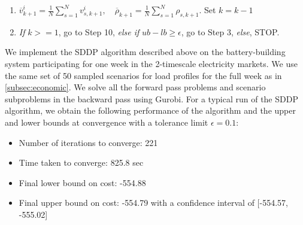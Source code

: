 \documentclass[11pt,twoside]{article}
\begin{document}
{\begin{enumerate}
\begin{enumerate}
\item Add a cut to the optimization problems $\mathcal{P}^f_{k}$ and $\mathcal{P}^b_{k}$: $\theta_{k+1} \geq \overline{v}^i_{k+1} - \overline{\rho}_{k+1}E_{n_\text{rtm}, k}$
\item Solve the problem $\mathcal{P}^b_{k}$. Get the optimal objective value $Q^{i+1}_{s,k+1}(E_{0, k})$ and the duals corresponding to each of the ${n_\text{rtm}}$ constraints linking the state variables at each subinterval. Denote the sum of these duals by $\rho_{s,k+1}$ and calculate $v^i_{s,k+1} = Q^{i+1}_{s,k+1}(E_{0, k}) - \rho_{s,k+1} E_{n_\text{rtm},k-1}$
\end{enumerate}
\emph{end for}
\item $\overline{v}^i_{k+1} = \frac{1}{N}\sum\limits_{s=1}^{N}{v^i_{s,k+1}}, \quad \overline{\rho}_{k+1} = \frac{1}{N}\sum\limits_{s=1}^{N}{\rho_{s,k+1}}$. Set $k=k-1$
\item \emph{If} $k >= 1$, go to Step 10, \emph{else if} $ub - lb \geq \epsilon$, go to Step 3, \emph{else}, STOP.
\end{enumerate}}

We implement the SDDP algorithm described above on the battery-building system participating for one week in the 2-timescale electricity markets. We use the same set of 50 sampled scenarios for load profiles for the full week as in \ref{subsec:economic}. We solve all the forward pass problems and scenario subproblems in the backward pass using Gurobi. For a typical run of the SDDP algorithm, we obtain the following performance of the algorithm and the upper and lower bounds at convergence with a tolerance limit $\epsilon = 0.1$:
\begin{itemize}
\item Number of iterations to converge: 221
\item Time taken to converge: 825.8 sec
\item Final lower bound on cost: -554.88
\item Final upper bound on cost: -554.79 with a confidence interval of [-554.57, -555.02]
\end{itemize}
\end{document}

